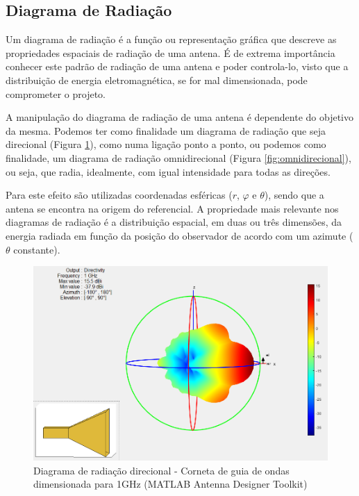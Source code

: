 \subsection*{Diagrama de Radiação}
Um diagrama de radiação é a função ou representação gráfica que descreve as propriedades espaciais de radiação de uma antena. É de extrema importância conhecer este padrão de radiação de uma antena e poder controla-lo, visto que a distribuição de energia eletromagnética, se for mal dimensionada, pode comprometer o projeto. \par 

A manipulação do diagrama de radiação de uma antena é dependente do objetivo da mesma. Podemos ter como finalidade um diagrama de radiação que seja direcional (Figura \ref{fig:direcional}), como numa ligação ponto a ponto, ou podemos como finalidade, um diagrama de radiação omnidirecional (Figura \ref{fig:omnidirecional}), ou seja, que radia, idealmente, com igual intensidade para todas as direções.\par

Para este efeito são utilizadas coordenadas esféricas ($r$, $\varphi$ e $\theta$), sendo que a antena se encontra na origem do referencial. A propriedade mais relevante nos diagramas de radiação é a distribuição espacial, em duas ou três dimensões, da energia radiada em função da posição do observador de acordo com um azimute ($\theta$ constante).\par 

\begin{figure}[h]
\centering
\includegraphics[scale=0.6]{chapters/ch3/assets/matlab_ad1}
\caption[Diagrama de radiação direcional]{Diagrama de radiação direcional - Corneta de guia de ondas dimensionada para 1GHz (MATLAB Antenna Designer Toolkit)}
\label{fig:direcional}
\end{figure}

